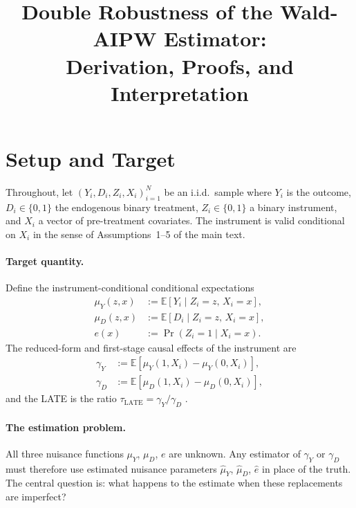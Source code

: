 \documentclass[12pt,a4paper]{article}
\title{%
  Double Robustness of the Wald-AIPW Estimator:\\
  Derivation, Proofs, and Interpretation%
}
\author{}
\date{}
\theoremstyle{remark}
\newcommand{\E}{\mathbb{E}}
\newcommand{\muY}{\mu_Y}
\newcommand{\muD}{\mu_D}
\newcommand{\muYhat}{\hat{\mu}_Y}
\newcommand{\muDhat}{\hat{\mu}_D}
\newcommand{\ehat}{\hat{e}}
\begin{document}
\maketitle
\tableofcontents
\vspace{1em}

\section{Setup and Target}
\label{sec:setup}

Throughout, let $(Y_i, D_i, Z_i, X_i)_{i=1}^N$ be an i.i.d.\ sample where $Y_i$ is the
outcome, $D_i \in \{0,1\}$ the endogenous binary treatment, $Z_i \in \{0,1\}$ a binary
instrument, and $X_i$ a vector of pre-treatment covariates. The instrument is valid
conditional on $X_i$ in the sense of Assumptions~1--5 of the main text.

\paragraph{Target quantity.}
Define the instrument-conditional conditional expectations
\begin{align}
  \muY(z, x) &:= \E[Y_i \mid Z_i = z,\, X_i = x], \label{eq:muY} \\
  \muD(z, x) &:= \E[D_i \mid Z_i = z,\, X_i = x], \label{eq:muD} \\
  e(x)        &:= \Pr(Z_i = 1 \mid X_i = x). \label{eq:e}
\end{align}
The reduced-form and first-stage causal effects of the instrument are
\begin{align}
  \gamma_Y &:= \E[\muY(1, X_i) - \muY(0, X_i)], \label{eq:gammaY} \\
  \gamma_D &:= \E[\muD(1, X_i) - \muD(0, X_i)], \label{eq:gammaD}
\end{align}
and the LATE is the ratio $\tau_{\mathrm{LATE}} = \gamma_Y / \gamma_D$
\citep{imbens1994identification, tan2006distributional}.

\paragraph{The estimation problem.}
All three nuisance functions $\muY$, $\muD$, $e$ are unknown. Any estimator of
$\gamma_Y$ or $\gamma_D$ must therefore use estimated nuisance parameters
$\muYhat$, $\muDhat$, $\ehat$ in place of the truth. The central question is: what
happens to the estimate when these replacements are imperfect?
\end{document}
